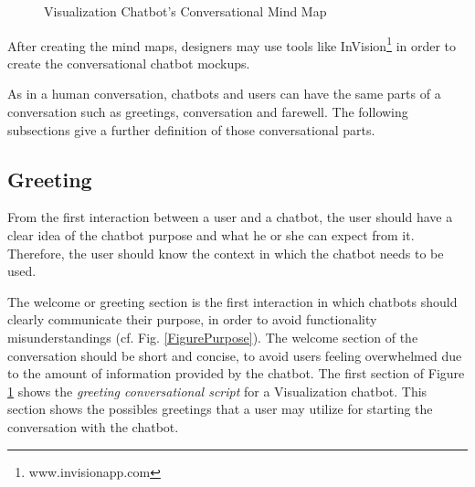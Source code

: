 \documentclass[a4paper,10pt]{article}
\begin{document}

\begin{figure}
    \caption{Visualization Chatbot's Conversational Mind Map}
   \label{FigureMindMap}
\end{figure}

After creating the mind maps, designers may use tools like InVision\footnote{www.invisionapp.com} in order to create the conversational chatbot mockups.

As in a human conversation, chatbots and users can have the same parts of a conversation such as greetings,  conversation and farewell. The following subsections give a further definition of those conversational parts.

\subsection{Greeting}
From the first interaction between a user and a chatbot, the user should have a clear idea of the chatbot purpose and what he or she can expect from it. Therefore, the user should know the context in which the chatbot needs to be used.

The welcome or greeting section is the first interaction in which chatbots should clearly communicate their purpose, in order to avoid functionality misunderstandings (cf. Fig. \ref{FigurePurpose}). 
The welcome section of the conversation should be short and concise, to avoid users feeling overwhelmed due to the amount of information provided by the chatbot. The first section of Figure \ref{FigureMindMap} shows the \textit{greeting conversational script} for a Visualization chatbot. This section shows the possibles greetings that a user may utilize for starting the conversation with the chatbot.  
\end{document}
